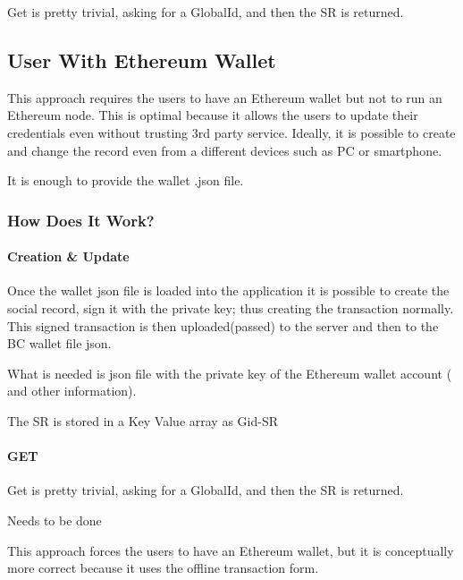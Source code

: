 Get is pretty trivial, asking for a GlobalId, and then the SR is returned. 

\subsection{User With Ethereum Wallet}

This approach requires the users to have an Ethereum wallet but not to run an Ethereum node.
This is optimal because it allows the users to update their credentials even without trusting 3rd party service. Ideally, it is possible to create and change the record even from a different devices such as PC or smartphone.

It is enough to provide the wallet .json file.

\subsubsection{How Does It Work?}
\paragraph{Creation \& Update}

Once the wallet json file is loaded into the application it is possible to create the social record, sign it with the private key; thus creating the transaction normally. This signed transaction is then uploaded(passed) to the server and then to the BC wallet file json.

What is needed is json file with the private key of the Ethereum wallet account ( and other information).

The SR is stored in a Key Value array as Gid-SR

\paragraph{GET}

Get is pretty trivial, asking for a GlobalId, and then the SR is returned.
\begin{notation}

Needs to be done
\end{notation}

This approach forces the users to have an Ethereum wallet, but it is conceptually more correct because it uses the offline transaction form.
